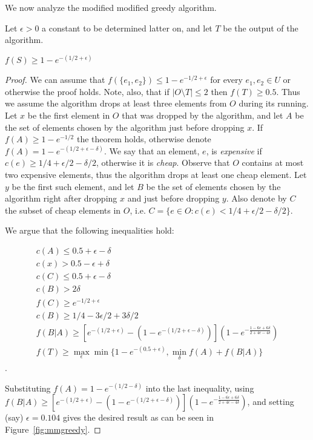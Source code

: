 We now analyze the modified modified greedy algorithm.

Let $\epsilon > 0$ a constant to be determined latter on, and let $T$ be the output of 
the algorithm.

\begin{theorem}
$f(S) \geq 1 - e^{-(1/2 + \epsilon)}$
\end{theorem}

\begin{proof}
We can assume that $f(\{e_1, e_2\}) \leq 1 - e^{-1/2 + \epsilon}$ 
for every $e_1, e_2 \in U$ or otherwise the proof holds.
Note, also, that if $|O \setminus T| \leq 2$ then $f(T) \geq 0.5$.
Thus we assume the algorithm drops at least three elements from $O$ during its running.
Let $x$ be the first element in $O$ that was dropped by the algorithm, 
and let $A$ be the set of elements chosen by the algorithm just before dropping $x$.
If $f(A) \geq 1 - e^{-1/2}$ the theorem holds, 
otherwise denote $f(A) = 1 - e^{-(1/2 + \epsilon - \delta)}$.
We say that an element, $e$, is \emph{expensive} if $c(e) \ge 1/4 + \epsilon/2 - \delta/2$, 
otherwise it is \emph{cheap}.
Observe that $O$ contains at most two expensive elements, thus the algorithm drops 
at least one cheap element. 
Let $y$ be the first such element, and let $B$ be the set of elements chosen by the 
algorithm right after dropping $x$ and just before dropping $y$.
Also denote by $C$ the subset of cheap elements in $O$, 
i.e. $C = \{e \in O : c(e) < 1/4 + \epsilon/2 - \delta/2\}$.

We argue that the following inequalities hold:

\begin{align}
c(A) \leq 0.5 + \epsilon - \delta 
\\
c(x) > 0.5 -\epsilon + \delta
\\
c(C) \leq 0.5 + \epsilon - \delta
\\
c(B) > 2\delta
\\
f(C) \ge e^{-1/2 + \epsilon}
\\
c(B) \ge 1/4 - 3\epsilon/2 + 3\delta/2
\\
f(B|A) \ge \left[
e^{-(1/2 + \epsilon)}
- (1 - e^{-(1/2 + \epsilon - \delta)})
\right]
(1-e^{-\frac{1-6\epsilon+6\delta}{2+4\epsilon-4\delta}})
\\
f(T) \geq \max_\epsilon \min \{1 - e^{-(0.5 + \epsilon)}, \min_{\delta} f(A) + f(B|A)\}
\end{align}
.

Substituting $f(A) = 1 - e^{-(1/2 - \delta)}$ into the last inequality, 
using $f(B|A) \ge \left[
e^{-(1/2 + \epsilon)}
- (1 - e^{-(1/2 + \epsilon - \delta)})
\right]
(1-e^{-\frac{1-6\epsilon+6\delta}{2+4\epsilon-4\delta}})
$,
and setting (say) $\epsilon = 0.104$ gives the desired result 
as can be seen in Figure~\ref{fig:mmgreedy}.

\end{proof}

